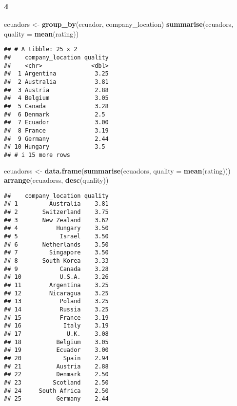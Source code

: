 \documentclass[
]{article}
\newenvironment{Shaded}{\begin{snugshade}}{\end{snugshade}}
\newcommand{\AttributeTok}[1]{\textcolor[rgb]{0.13,0.29,0.53}{#1}}
\newcommand{\FunctionTok}[1]{\textcolor[rgb]{0.13,0.29,0.53}{\textbf{#1}}}
\newcommand{\NormalTok}[1]{#1}
\newcommand{\OtherTok}[1]{\textcolor[rgb]{0.56,0.35,0.01}{#1}}
\begin{document}
\hypertarget{section-2}{%
\subsubsection{4}\label{section-2}}

\begin{Shaded}
\begin{Highlighting}[]
\NormalTok{ecuadors }\OtherTok{\textless{}{-}} \FunctionTok{group\_by}\NormalTok{(ecuador, company\_location)}
\FunctionTok{summarise}\NormalTok{(ecuadors, }\AttributeTok{quality =} \FunctionTok{mean}\NormalTok{(rating))}
\end{Highlighting}
\end{Shaded}

\begin{verbatim}
## # A tibble: 25 x 2
##    company_location quality
##    <chr>              <dbl>
##  1 Argentina           3.25
##  2 Australia           3.81
##  3 Austria             2.88
##  4 Belgium             3.05
##  5 Canada              3.28
##  6 Denmark             2.5 
##  7 Ecuador             3.00
##  8 France              3.19
##  9 Germany             2.44
## 10 Hungary             3.5 
## # i 15 more rows
\end{verbatim}

\begin{Shaded}
\begin{Highlighting}[]
\NormalTok{ecuadorss }\OtherTok{\textless{}{-}} \FunctionTok{data.frame}\NormalTok{(}\FunctionTok{summarise}\NormalTok{(ecuadors, }\AttributeTok{quality =} \FunctionTok{mean}\NormalTok{(rating)))}
\FunctionTok{arrange}\NormalTok{(ecuadorss, }\FunctionTok{desc}\NormalTok{(quality))}
\end{Highlighting}
\end{Shaded}

\begin{verbatim}
##    company_location quality
## 1         Australia    3.81
## 2       Switzerland    3.75
## 3       New Zealand    3.62
## 4           Hungary    3.50
## 5            Israel    3.50
## 6       Netherlands    3.50
## 7         Singapore    3.50
## 8       South Korea    3.33
## 9            Canada    3.28
## 10           U.S.A.    3.26
## 11        Argentina    3.25
## 12        Nicaragua    3.25
## 13           Poland    3.25
## 14           Russia    3.25
## 15           France    3.19
## 16            Italy    3.19
## 17             U.K.    3.08
## 18          Belgium    3.05
## 19          Ecuador    3.00
## 20            Spain    2.94
## 21          Austria    2.88
## 22          Denmark    2.50
## 23         Scotland    2.50
## 24     South Africa    2.50
## 25          Germany    2.44
\end{verbatim}
\end{document}

